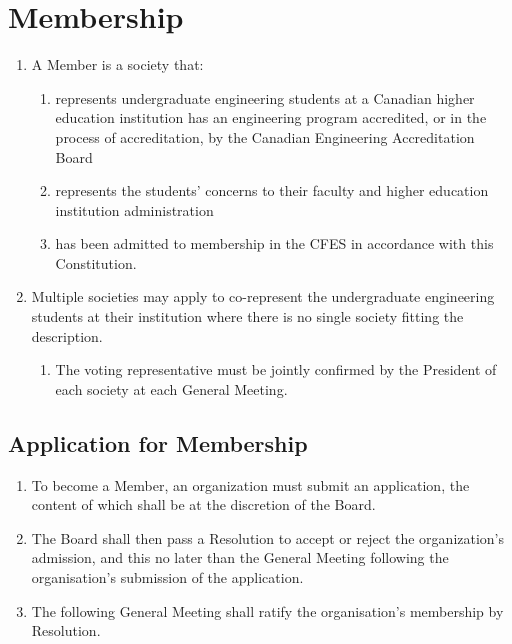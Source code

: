 \section{Membership}
\label{membership}

\begin{enumerate}
 \item A Member is a society that:
  \begin{enumerate}
   \item represents undergraduate engineering students at a Canadian higher education institution has an engineering program accredited, or in the process of accreditation, by the Canadian Engineering Accreditation Board
   \item represents the students' concerns to their faculty and higher education institution administration
   \item has been admitted to membership in the CFES in accordance with this Constitution.
  \end{enumerate}
 \item Multiple societies may apply to co-represent the undergraduate engineering students at their institution where there is no single society fitting the description.
  \begin{enumerate}
   \item The voting representative must be jointly confirmed by the President of each society at each General Meeting.
  \end{enumerate}
\end{enumerate}

\subsection{Application for Membership}
\label{membership-application-for-membership}

\begin{enumerate}
 \item To become a Member, an organization must submit an application, the content of which shall be at the discretion of the Board.
 \item The Board shall then pass a Resolution to accept or reject the organization's admission, and this no later than the General Meeting following the organisation's submission of the application.
 \item The following General Meeting shall ratify the organisation’s membership by Resolution.
\end{enumerate}
